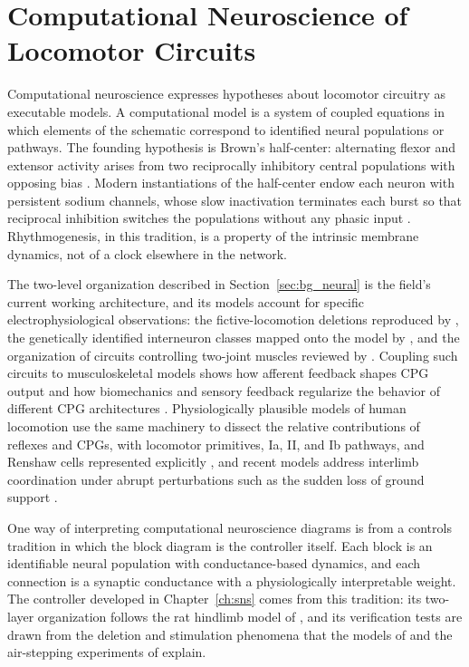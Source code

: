 \section{Computational Neuroscience of Locomotor Circuits}\label{sec:bg_compneuro}

Computational neuroscience expresses hypotheses about locomotor circuitry as executable models. A computational model is a system of coupled equations in which elements of the schematic correspond to identified neural populations or pathways. The founding hypothesis is Brown's half-center: alternating flexor and extensor activity arises from two reciprocally inhibitory central populations with opposing bias \citep{brown_intrinsic_1911}. Modern instantiations of the half-center endow each neuron with persistent sodium channels, whose slow inactivation terminates each burst so that reciprocal inhibition switches the populations without any phasic input \citep{deng_neuromechanical_2019}. Rhythmogenesis, in this tradition, is a property of the intrinsic membrane dynamics, not of a clock elsewhere in the network.

The two-level organization described in Section~\ref{sec:bg_neural} is the field's current working architecture, and its models account for specific electrophysiological observations: the fictive-locomotion deletions reproduced by \citet{rybak_modelling_2006}, the genetically identified interneuron classes mapped onto the model by \citet{rybak_organization_2015}, and the organization of circuits controlling two-joint muscles reviewed by \citet{shevtsova_modeling_2016}. Coupling such circuits to musculoskeletal models shows how afferent feedback shapes CPG output \citep{markin_afferent_2010} and how biomechanics and sensory feedback regularize the behavior of different CPG architectures \citep{deng_biomechanical_2022}. Physiologically plausible models of human locomotion use the same machinery to dissect the relative contributions of reflexes and CPGs, with locomotor primitives, Ia, II, and Ib pathways, and Renshaw cells represented explicitly \citep{dirusso_investigating_2023}, and recent models address interlimb coordination under abrupt perturbations such as the sudden loss of ground support \citep{shinohara_mechanisms_2025}.

One way of interpreting computational neuroscience diagrams is from a controls tradition in which the block diagram is the controller itself. Each block is an identifiable neural population with conductance-based dynamics, and each connection is a synaptic conductance with a physiologically interpretable weight. The controller developed in Chapter~\ref{ch:sns} comes from this tradition: its two-layer organization follows the rat hindlimb model of \citet{deng_neuromechanical_2019}, and its verification tests are drawn from the deletion and stimulation phenomena that the models of \citet{rybak_modelling_2006} and the air-stepping experiments of \citet{selionov_tonic_2009} explain.

